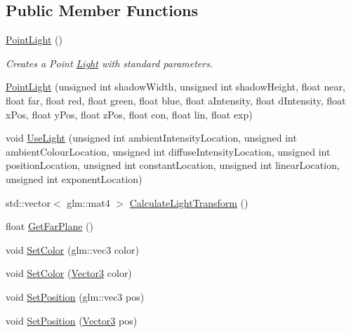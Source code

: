 \subsection*{Public Member Functions}
\begin{DoxyCompactItemize}
\item 
\mbox{\label{class_point_light_abbfdf5f05b559c49016f8bb97b0ca414}} 
\mbox{\hyperlink{class_point_light_abbfdf5f05b559c49016f8bb97b0ca414}{Point\+Light}} ()
\begin{DoxyCompactList}\small\item\em Creates a Point \mbox{\hyperlink{class_light}{Light}} with standard parameters. \end{DoxyCompactList}\item 
\mbox{\hyperlink{class_point_light_aeb669be7e03cd019c39adcdccbf78025}{Point\+Light}} (unsigned int shadow\+Width, unsigned int shadow\+Height, float near, float far, float red, float green, float blue, float a\+Intensity, float d\+Intensity, float x\+Pos, float y\+Pos, float z\+Pos, float con, float lin, float exp)
\item 
void \mbox{\hyperlink{class_point_light_a1cc5f1e9a33b13cef881e4ef555ff074}{Use\+Light}} (unsigned int ambient\+Intensity\+Location, unsigned int ambient\+Colour\+Location, unsigned int diffuse\+Intensity\+Location, unsigned int position\+Location, unsigned int constant\+Location, unsigned int linear\+Location, unsigned int exponent\+Location)
\item 
std\+::vector$<$ glm\+::mat4 $>$ \mbox{\hyperlink{class_point_light_ad8abf7541c6b7113bb5aa324272f9900}{Calculate\+Light\+Transform}} ()
\item 
float \mbox{\hyperlink{class_point_light_aed9b70818ab7ddfe9c94ca895233f1de}{Get\+Far\+Plane}} ()
\item 
void \mbox{\hyperlink{class_point_light_a13bb07ff4d5be58f18bc1530cf0e8abe}{Set\+Color}} (glm\+::vec3 color)
\item 
void \mbox{\hyperlink{class_point_light_ae4d7fa67626719729b4ff66a265f0b0c}{Set\+Color}} (\mbox{\hyperlink{struct_vector3}{Vector3}} color)
\item 
void \mbox{\hyperlink{class_point_light_a707125b77b9ae421f43760540496c5d0}{Set\+Position}} (glm\+::vec3 pos)
\item 
void \mbox{\hyperlink{class_point_light_a49025fcac39e59e0ac0ed6c46ac290bb}{Set\+Position}} (\mbox{\hyperlink{struct_vector3}{Vector3}} pos)
\item 

\end{DoxyCompactItemize}
